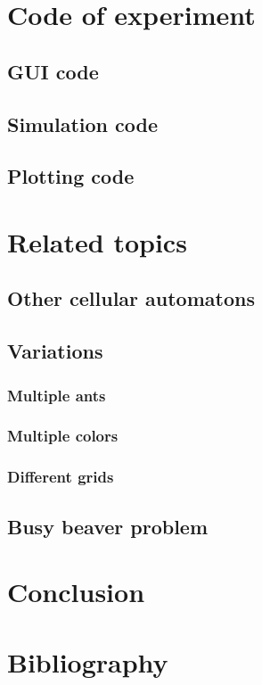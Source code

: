 \documentclass{article}
\begin{document}
\section{Code of experiment}
\subsection{GUI code}
\subsection{Simulation code}
\subsection{Plotting code}

\section{Related topics}
\subsection{Other cellular automatons}
\subsection{Variations}
\subsubsection{Multiple ants}
\subsubsection{Multiple colors}
\subsubsection{Different grids}
\subsection{Busy beaver problem}


\section{Conclusion}


\section{Bibliography}
\end{document}
